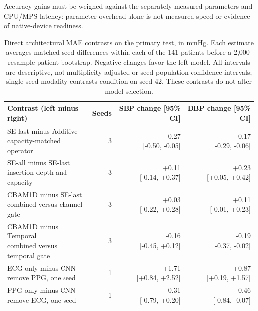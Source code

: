 \documentclass[11pt]{article}
\begin{document}
Accuracy gains must be weighed against the separately measured parameters and CPU/MPS latency; parameter overhead alone is not measured speed or evidence of native-device readiness.

\begin{table}[t]\centering\scriptsize\setlength{\tabcolsep}{4pt}\renewcommand{\arraystretch}{1.15}
\begin{tabular}{lrrr}\toprule
Contrast (left minus right) & Seeds & SBP change [95\% CI] & DBP change [95\% CI]\\\midrule
\shortstack{SE-last minus Additive\\{capacity-matched operator}} & 3 & \shortstack{-0.27\\{[-0.50, -0.05]}} & \shortstack{-0.17\\{[-0.29, -0.06]}}\\
\shortstack{SE-all minus SE-last\\{insertion depth and capacity}} & 3 & \shortstack{+0.11\\{[-0.14, +0.37]}} & \shortstack{+0.23\\{[+0.05, +0.42]}}\\
\shortstack{CBAM1D minus SE-last\\{combined versus channel gate}} & 3 & \shortstack{+0.03\\{[-0.22, +0.28]}} & \shortstack{+0.11\\{[-0.01, +0.23]}}\\
\shortstack{CBAM1D minus Temporal\\{combined versus temporal gate}} & 3 & \shortstack{-0.16\\{[-0.45, +0.12]}} & \shortstack{-0.19\\{[-0.37, -0.02]}}\\
\shortstack{ECG only minus CNN\\{remove PPG, one seed}} & 1 & \shortstack{+1.71\\{[+0.84, +2.52]}} & \shortstack{+0.87\\{[+0.19, +1.57]}}\\
\shortstack{PPG only minus CNN\\{remove ECG, one seed}} & 1 & \shortstack{-0.31\\{[-0.79, +0.20]}} & \shortstack{-0.46\\{[-0.84, -0.07]}}\\
\bottomrule\end{tabular}
\caption{Direct architectural MAE contrasts on the primary test, in mmHg. Each estimate averages matched-seed differences within each of the 141 patients before a 2,000-resample patient bootstrap. Negative changes favor the left model. All intervals are descriptive, not multiplicity-adjusted or seed-population confidence intervals; single-seed modality contrasts condition on seed 42. These contrasts do not alter model selection.}\end{table}
\end{document}
